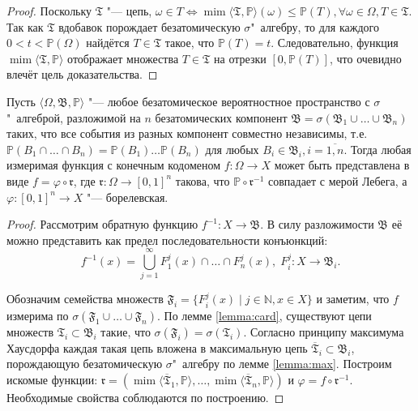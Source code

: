 \begin{proof}
	Поскольку $\mathfrak{T}$ "--- цепь, $\omega \in T \Leftrightarrow \operatorname{mim}\langle\mathfrak{T}, \mathbb{P}\rangle(\omega) \le \mathbb{P}(T), \forall \omega \in \Omega, T \in \mathfrak{T}$. Так как $\mathfrak{T}$ вдобавок порождает безатомическую $\sigma$"~алгебру, то для каждого $0 < t < \mathbb{P}(\Omega)$ найдётся $T \in \mathfrak{T}$ такое, что $\mathbb{P}(T) = t$. Следовательно, функция $\operatorname{mim}\langle\mathfrak{T}, \mathbb{P}\rangle$ отображает множества $T \in \mathfrak{T}$ на отрезки $[0, \mathbb{P}(T)]$, что очевидно влечёт цель доказательства.
\end{proof}

\begin{lemma} \label{lemma:consp}
	Пусть $\langle \Omega, \mathfrak{B}, \mathbb{P} \rangle$ "--- любое безатомическое вероятностное пространство с $\sigma$"~алгеброй, разложимой на $n$ безатомических компонент $\mathfrak{B} = \sigma(\mathfrak{B}_1 \cup \ldots \cup \mathfrak{B}_n)$ таких, что все события из разных компонент совместно независимы, т.е. $\mathbb{P}(B_1 \cap \ldots \cap B_n) = \mathbb{P}(B_1) \ldots \mathbb{P}(B_n)$ для любых $B_i \in \mathfrak{B}_i, i=\overline{1,n}$. Тогда любая измеримая функция с конечным кодоменом $f : \Omega \rightarrow X$ может быть представлена в виде $f = \varphi \circ \mathfrak{r}$, где $\mathfrak{r} : \Omega \rightarrow [0,1]^n$ такова, что $\mathbb{P} \circ \mathfrak{r}^{-1}$ совпадает с мерой Лебега, а $\varphi : [0,1]^n \rightarrow X$ "--- борелевская.
\end{lemma}

\begin{proof}
	Рассмотрим обратную функцию $f^{-1} : X \rightarrow \mathfrak{B}$. В силу разложимости $\mathfrak{B}$ её можно представить как предел последовательности конъюнкций:
	\begin{equation*}
		f^{-1}(x) = \bigcup_{j=1}^\infty F_1^j(x) \cap \ldots \cap F_n^j(x), \; F_i^j : X \rightarrow \mathfrak{B}_i.
	\end{equation*}
	
	Обозначим семейства множеств $\mathfrak{F}_i = \{F_i^j(x) \mid j \in \mathbb{N}, x \in X\}$ и заметим, что $f$ измерима по $\sigma(\mathfrak{F}_1 \cup \ldots \cup \mathfrak{F}_n)$. По лемме \ref{lemma:card}, существуют цепи множеств $\mathfrak{T}_i \subset \mathfrak{B}_i$ такие, что $\sigma(\mathfrak{F}_i) = \sigma(\mathfrak{T}_i)$. Согласно принципу максимума Хаусдорфа каждая такая цепь вложена в максимальную цепь $\overline{\mathfrak{T}}_i \subset \mathfrak{B}_i$, порождающую безатомическую $\sigma$"~алгебру по лемме \ref{lemma:max}. Построим искомые функции: $\mathfrak{r} = (\operatorname{mim}\langle\overline{\mathfrak{T}}_1, \mathbb{P}\rangle, \ldots, \operatorname{mim}\langle\overline{\mathfrak{T}}_n, \mathbb{P}\rangle)$ и $\varphi = f \circ \mathfrak{r}^{-1}$. Необходимые свойства соблюдаются по построению.
\end{proof}

